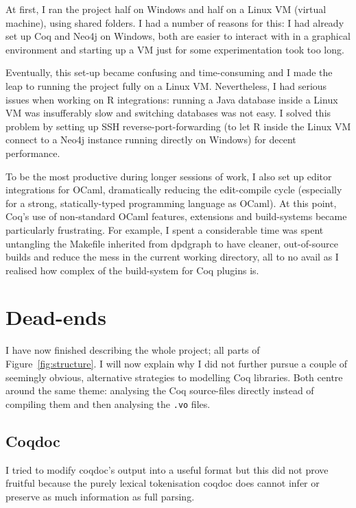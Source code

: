 At first, I ran the project half on Windows and half on a Linux VM (virtual
machine), using shared folders. I had a number of reasons for this: I had
already set up Coq and Neo4j on Windows, both are easier to interact with in a
graphical environment and starting up a VM just for some experimentation took
too long.

Eventually, this set-up became confusing and time-consuming and I made the leap
to running the project fully on a Linux VM. Nevertheless, I had serious issues
when working on R integrations: running a Java database inside a Linux VM was
insufferably slow and switching databases was not easy. I solved this problem by
setting up SSH reverse-port-forwarding (to let R inside the Linux VM connect to
a Neo4j instance running directly on Windows) for decent performance.

To be the most productive during longer sessions of work, I also set up editor
integrations for OCaml, dramatically reducing the edit-compile cycle (especially
for a strong, statically-typed programming language as OCaml). At this point,
Coq's use of non-standard OCaml features, extensions and build-systems became
particularly frustrating. For example, I spent a considerable time was spent
untangling the Makefile inherited from dpdgraph to have cleaner, out-of-source
builds and reduce the mess in the current working directory, all to no avail as
I realised how complex of the build-system for Coq plugins is.

\section{Dead-ends}

I have now finished describing the whole project; all parts of
Figure~\ref{fig:structure}. I will now explain why I did not further pursue a
couple of seemingly obvious, alternative strategies to modelling Coq libraries.
Both centre around the same theme: analysing the Coq source-files directly
instead of compiling them and then analysing the \texttt{.vo} files.


\subsection{Coqdoc}

I tried to modify coqdoc's output into a useful format but this did not prove
fruitful because the purely lexical tokenisation coqdoc does cannot infer or
preserve as much information as full parsing.

